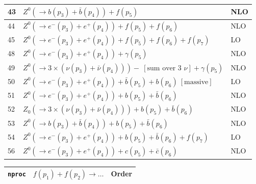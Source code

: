 \documentclass[12pt]{article}
\begin{document}
\begin{itemize}
\begin{table}
\begin{center}
\begin{tabular}{|l|l|l|}
43& $ Z^0(\to b(p_3)+\bar{b}(p_4))+f(p_5) $ & NLO \\
\hline 
44& $ Z^0(\to e^-(p_3)+e^+(p_4))+f(p_5)+f(p_6) $ & NLO \\
45& $ Z^0(\to e^-(p_3)+e^+(p_4))+f(p_5)+f(p_6)+f(p_7) $ & LO \\
\hline 
48& $ Z^0(\to e^-(p_3)+e^+(p_4))+\gamma(p_5) $ & NLO \\
49& $ Z^0(\to 3\times(\nu(p_3)+\bar{\nu}(p_4)))-~[ \mbox{sum over 3 $\nu$} ]+\gamma(p_5) $ & NLO \\
\hline 
50& $ Z^0(\to e^-(p_3)+e^+(p_4))+\bar{b}(p_5)+b(p_6) ~[ \mbox{massive} ] $ & LO \\
51& $ Z^0(\to e^-(p_3)+e^+(p_4))+b(p_5)+\bar{b}(p_6) $ & NLO \\
52& $ Z_0(\to 3\times(\nu(p_3)+\bar{\nu}(p_4)))+b(p_5)+\bar{b}(p_6) $ & NLO \\
53& $ Z^0(\to b(p_3)+\bar{b}(p_4))+b(p_5)+\bar{b}(p_6) $ & NLO \\
54& $ Z^0(\to e^-(p_3)+e^+(p_4))+b(p_5)+\bar{b}(p_6)+f(p_7) $ & LO \\
\hline 
56& $ Z^0(\to e^-(p_3)+e^+(p_4))+c(p_5)+\bar{c}(p_6) $ & NLO \\
\hline 
\end{tabular}
\end{center}
\end{table}
\begin{table}
\begin{center}
\hspace*{-1.5cm}
\begin{tabular}{|l|l|l|}
\hline
{\tt nproc} & $ f(p_1)+f(p_2) \to \ldots $& Order \\ 
\hline


\end{tabular}
\end{center}
\end{table}
\end{itemize}
\end{document}
